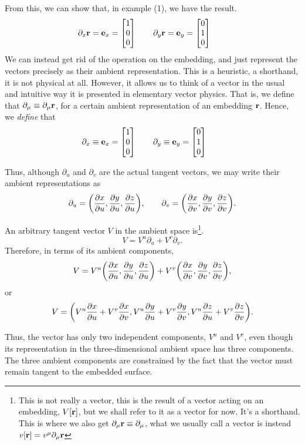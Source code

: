 \begin{enumerate}[(1)]
				From this, we can show that, in example (1), we have the result.
				\[
					\p_x \vb{r} = \vb{e}_x = \bmqty{
						1\\0\\0
					} \qquad 
					\p_y \vb{r} = \vb{e}_y = \bmqty{
						0\\1\\0
					} \qquad 
				\]
				We can instead get rid of the operation on the embedding, and just 
				represent the vectors precisely as their ambient representation. This
				is a heuristic, a shorthand, it is not physical at all. However, it allows us to think 
				of a vector in the usual and intuitive way it is presented in elementary vector physics.
				That is, we define that $\partial_\mu \equiv \partial_\mu \vb{r}$, for a certain
				ambient representation of an embedding $\vb{r}$. Hence, we \textit{define}
				that
				\[
					\p_x \equiv \vb{e}_x = \bmqty{
						1\\0\\0
					} \qquad 
					\p_y \equiv \vb{e}_y = \bmqty{
						0\\1\\0
					} \qquad 
				\]
				
				Thus, although $\partial_u$ and $\partial_v$ are the actual
				tangent vectors, we may write their ambient representations as
				\[
					\partial_u
					=
					\pqty{
						\pdv{x}{u},
						\pdv{y}{u},
						\pdv{z}{u}
					},
					\qquad
					\partial_v
					=
					\pqty{
						\pdv{x}{v},
						\pdv{y}{v},
						\pdv{z}{v}
					}.
				\]

				An arbitrary tangent vector $V$ in the ambient space is\footnote{This is not really a vector, this is the result of a vector acting on an embedding, $V[\vb{r}]$, but we shall refer to it as a vector for now. It's a shorthand. This is where we also get $\partial_\mu \vb{r}\equiv \partial_\mu$, what we usually call a vector is instead $v[\vb{r}] = v^\mu \partial_\mu\vb{r}$}.
				\[
					V
					=
					V^u\partial_u+V^v\partial_v.
				\]
				Therefore, in terms of its ambient components,
				\[
					V
					=
					V^u
					\pqty{
						\pdv{x}{u},
						\pdv{y}{u},
						\pdv{z}{u}
					}
					+
					V^v
					\pqty{
						\pdv{x}{v},
						\pdv{y}{v},
						\pdv{z}{v}
					},
				\]
				or
				\[
					V
					=
					\pqty{
						V^u\pdv{x}{u}+V^v\pdv{x}{v},
						V^u\pdv{y}{u}+V^v\pdv{y}{v},
						V^u\pdv{z}{u}+V^v\pdv{z}{v}
					}.
				\]

				Thus, the vector has only two independent components,
				$V^u$ and $V^v$, even though its representation in the
				three-dimensional ambient space has three components. The
				three ambient components are constrained by the fact that the
				vector must remain tangent to the embedded surface.


\end{enumerate}
